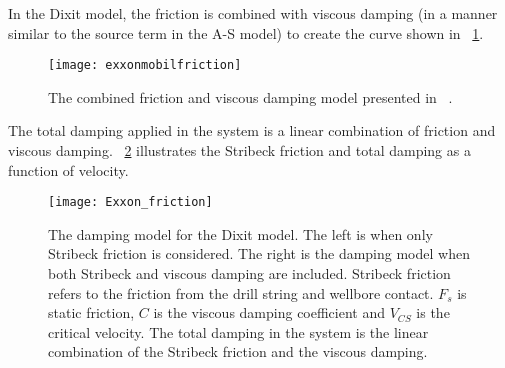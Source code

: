 In the Dixit model, the friction is combined with viscous damping (in a manner similar to the source term in the A-S model) to create the curve shown in \figurename~\ref{fig:exxonmobilfriction}.
\begin{figure}
	\centering
	\texttt{[image: exxonmobilfriction]}
	\caption[Comparison of friction models]{The combined friction and viscous damping model presented in ~\cite{ref:dixit2021a}.}
	\label{fig:exxonmobilfriction}
\end{figure}
The total damping applied in the system is a linear combination of friction and viscous damping. \figurename~\ref{figure_Exxon_friction} illustrates the Stribeck friction and total damping as a function of velocity.
\begin{figure}
	\centering
	\texttt{[image: Exxon\_friction]}
    \caption[Damping model for Dixit model]{The damping model for the Dixit model. The left is when only Stribeck friction is considered. The right is the damping model when both Stribeck and viscous damping are included. Stribeck friction refers to the friction from the drill string and wellbore contact. $F_{s}$ is static friction, $C$ is the viscous damping coefficient and $V_{CS}$ is the critical velocity. The total damping in the system is the linear combination of the Stribeck friction and the viscous damping.}
    \label{figure_Exxon_friction}
\end{figure}



